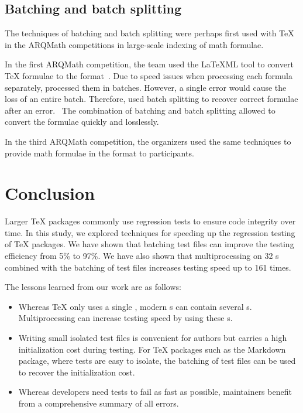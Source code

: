 \documentclass[final]{ltugboat}
\begin{document}
\subsection{Batching and batch splitting}
The techniques of batching and batch splitting were perhaps first used with \TeX{} in the ARQMath competitions in large-scale indexing of math formulae.

In the first ARQMath competition, the  team used the \LaTeX ML tool to convert \TeX{} formulae to the  format~\cite[Section~2.2]{novotny2020three}. Due to speed issues when processing each formula separately,  processed them in batches. However, a single error would cause the loss of an entire batch. Therefore,  used batch splitting to recover correct formulae after an error.~\cite{novotny2020arqmath} The combination of batching and batch splitting allowed  to convert the formulae quickly and losslessly.

In the third ARQMath competition, the organizers used the same techniques to provide math formulae in the  format to participants.

\section{Conclusion}
\label{sec:conclusion}

Larger \TeX{} packages commonly use regression tests to ensure code integrity over time.
In this study, we explored techniques for speeding up the regression testing of \TeX{} packages. We have shown that batching test files can improve the testing efficiency from 5\% to 97\%. We have also shown that multiprocessing on 32 s combined with the batching of test files increases testing speed up to 161 times.

The lessons learned from our work are as follows:

\begin{itemize}
\item Whereas \TeX{} only uses a single , modern s can contain several s. Multiprocessing can increase testing speed by using these s.
\item Writing small isolated test files is convenient for authors but carries a high initialization cost during testing. For \TeX{} packages such as the Markdown package, where tests are easy to isolate, the batching of test files can be used to recover the initialization cost.
\item Whereas developers need tests to fail as fast as possible, maintainers benefit from a comprehensive summary of all errors.
\end{itemize}
\end{document}
